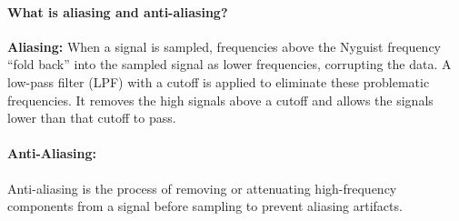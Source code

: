 \documentclass[reqno,9pt]{amsart}
\theoremstyle{plain}
\theoremstyle{definition}
\begin{document}
    \paragraph{\bf What is aliasing and anti-aliasing?} {\bf Aliasing:} When a signal is sampled, frequencies above the Nyguist frequency ``fold back'' into the sampled signal as lower frequencies, corrupting the data. A low-pass filter (LPF) with a cutoff is applied to eliminate these problematic frequencies. It removes the high signals above a cutoff and allows the signals lower than that cutoff to pass.

    \paragraph{\bf Anti-Aliasing:} Anti-aliasing is the process of removing or attenuating high-frequency components from a signal before sampling to prevent aliasing artifacts.

    


\end{document}
